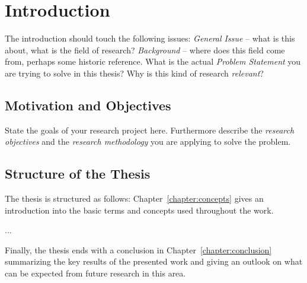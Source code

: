 
\chapter{Introduction} \label{chapter:introduction}

The introduction should touch the following issues: \emph{General
Issue} -- what is this about, what is the field of research?
\emph{Background} -- where does this field come from, perhaps some
historic reference. What is the actual \emph{Problem Statement} you
are trying to solve in this thesis? Why is this kind of research
\emph{relevant}?

\section{Motivation and Objectives}

State the goals of your research project here. Furthermore describe
the \emph{research objectives} and the \emph{research methodology}
you are applying to solve the problem.

\section{Structure of the Thesis} \label{sec:introduction:structure}

The thesis is structured as follows:
Chapter~\ref{chapter:concepts} gives an introduction into the
basic terms and concepts used throughout the work.

...

Finally, the thesis ends with a conclusion in
Chapter~\ref{chapter:conclusion} summarizing the key results of the
presented work and giving an outlook on what can be expected from
future research in this area.

